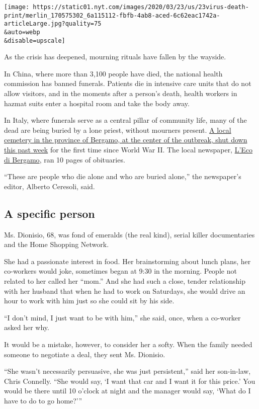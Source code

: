 \texttt{[image: https://static01.nyt.com/images/2020/03/23/us/23virus-death-print/merlin\_170575302\_6a115112-fbfb-4ab8-aced-6c62eac1742a-articleLarge.jpg?quality=75\\\&auto=webp\\\&disable=upscale]}

As the crisis has deepened, mourning rituals have fallen by the wayside.

In China, where more than 3,100 people have died, the national health
commission has banned funerals. Patients die in intensive care units
that do not allow visitors, and in the moments after a person's death,
health workers in hazmat suits enter a hospital room and take the body
away.

In Italy, where funerals serve as a central pillar of community life,
many of the dead are being buried by a lone priest, without mourners
present.
\href{https://www.nytimes.com/2020/03/16/world/europe/italy-coronavirus-funerals.html}{A
local cemetery in the province of Bergamo, at the center of the
outbreak, shut down this past week} for the first time since World War
II. The local newspaper, \href{https://www.ecodibergamo.it/}{L'Eco di
Bergamo}, ran 10 pages of obituaries.

``These are people who die alone and who are buried alone,'' the
newspaper's editor, Alberto Ceresoli, said.

\hypertarget{a-specific-person}{%
\subsection{A specific person}\label{a-specific-person}}

Ms. Dionisio, 68, was fond of emeralds (the real kind), serial killer
documentaries and the Home Shopping Network.

She had a passionate interest in food. Her brainstorming about lunch
plans, her co-workers would joke, sometimes began at 9:30 in the
morning. People not related to her called her ``mom.'' And she had such
a close, tender relationship with her husband that when he had to work
on Saturdays, she would drive an hour to work with him just so she could
sit by his side.

``I don't mind, I just want to be with him,'' she said, once, when a
co-worker asked her why.

It would be a mistake, however, to consider her a softy. When the family
needed someone to negotiate a deal, they sent Ms. Dionisio.

``She wasn't necessarily persuasive, she was just persistent,'' said her
son-in-law, Chris Connelly. ``She would say, `I want that car and I want
it for this price.' You would be there until 10 o'clock at night and the
manager would say, `What do I have to do to go home?'''

